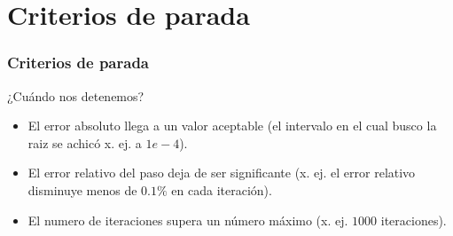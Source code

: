 \documentclass[xcolor=svgnames]{beamer} %
\theoremstyle{plain}
\theoremstyle{definition}
\begin{document}
\section{Criterios de parada}

\begin{frame}
\frametitle{Criterios de parada}
¿Cuándo nos detenemos?
\pause
\begin{itemize}
\item El error absoluto llega a un valor aceptable (el intervalo en el cual busco la raiz se achicó x. ej. a $1e-4$).
\pause
\item El error relativo del paso deja de ser significante (x. ej. el error relativo disminuye menos de $0.1\%$ en cada iteración).
\pause
\item El numero de iteraciones supera un número máximo  (x. ej. $1000$ iteraciones).
\end{itemize}

\end{frame}
\end{document}
